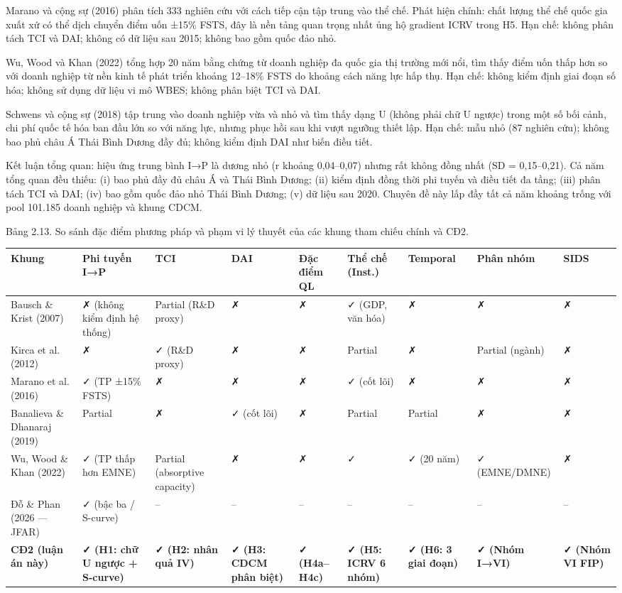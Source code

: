 \documentclass[12pt,a4paper]{article}
\begin{document}
Marano và cộng sự (2016) phân tích 333 nghiên cứu với cách tiếp cận tập
trung vào thể chế. Phát hiện chính: chất lượng thể chế quốc gia xuất xứ
có thể dịch chuyển điểm uốn ±15\% FSTS, đây là nền tảng quan trọng nhất
ủng hộ gradient ICRV trong H5. Hạn chế: không phân tách TCI và DAI;
không có dữ liệu sau 2015; không bao gồm quốc đảo nhỏ.

Wu, Wood và Khan (2022) tổng hợp 20 năm bằng chứng từ doanh nghiệp đa
quốc gia thị trường mới nổi, tìm thấy điểm uốn thấp hơn so với doanh
nghiệp từ nền kinh tế phát triển khoảng 12--18\% FSTS do khoảng cách
năng lực hấp thụ. Hạn chế: không kiểm định giai đoạn số hóa; không sử
dụng dữ liệu vi mô WBES; không phân biệt TCI và DAI.

Schwens và cộng sự (2018) tập trung vào doanh nghiệp vừa và nhỏ và tìm
thấy dạng U (không phải chữ U ngược) trong một số bối cảnh, chi phí quốc
tế hóa ban đầu lớn so với năng lực, nhưng phục hồi sau khi vượt ngưỡng
thiết lập. Hạn chế: mẫu nhỏ (87 nghiên cứu); không bao phủ châu Á Thái
Bình Dương đầy đủ; không kiểm định DAI như biến điều tiết.

Kết luận tổng quan: hiệu ứng trung bình I→P là dương nhỏ (r khoảng
0,04--0,07) nhưng rất không đồng nhất (SD = 0,15--0,21). Cả năm tổng
quan đều thiếu: (i) bao phủ đầy đủ châu Á và Thái Bình Dương; (ii) kiểm
định đồng thời phi tuyến và điều tiết đa tầng; (iii) phân tách TCI và
DAI; (iv) bao gồm quốc đảo nhỏ Thái Bình Dương; (v) dữ liệu sau 2020.
Chuyên đề này lấp đầy tất cả năm khoảng trống với pool 101.185 doanh
nghiệp và khung CDCM.

Bảng 2.13. So sánh đặc điểm phương pháp và phạm vi lý thuyết của các
khung tham chiếu chính và CĐ2.

\begin{longtable}[]{@{}lllllllll@{}}
\toprule\noalign{}
Khung & Phi tuyến I→P & TCI & DAI & Đặc điểm QL & Thể chế (Inst.) &
Temporal & Phân nhóm & SIDS \\
\midrule\noalign{}
\endhead
\bottomrule\noalign{}
\endlastfoot
Bausch \& Krist (2007) & ✗ (không kiểm định hệ thống) & Partial (R\&D
proxy) & ✗ & ✗ & ✓ (GDP, văn hóa) & ✗ & ✗ & ✗ \\
Kirca et al. (2012) & ✗ & ✓ (R\&D proxy) & ✗ & ✗ & Partial & ✗ & Partial
(ngành) & ✗ \\
Marano et al. (2016) & ✓ (TP ±15\% FSTS) & ✗ & ✗ & ✗ & ✓ (cốt lõi) & ✗ &
✗ & ✗ \\
Banalieva \& Dhanaraj (2019) & Partial & ✗ & ✓ (cốt lõi) & ✗ & Partial &
Partial & ✗ & ✗ \\
Wu, Wood \& Khan (2022) & ✓ (TP thấp hơn EMNE) & Partial (absorptive
capacity) & ✗ & ✗ & ✓ & ✓ (20 năm) & ✓ (EMNE/DMNE) & ✗ \\
Đỗ \& Phan (2026 --- JFAR) & ✓ (bậc ba / S-curve) & -- & -- & -- & -- &
-- & -- & -- \\
\textbf{CĐ2 (luận án này)} & \textbf{✓ (H1: chữ U ngược + S-curve)} &
\textbf{✓ (H2: nhân quả IV)} & \textbf{✓ (H3: CDCM phân biệt)} &
\textbf{✓ (H4a--H4c)} & \textbf{✓ (H5: ICRV 6 nhóm)} & \textbf{✓ (H6: 3
giai đoạn)} & \textbf{✓ (Nhóm I→VI)} & \textbf{✓ (Nhóm VI FIP)} \\
\end{longtable}
\end{document}
